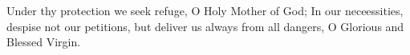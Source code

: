 \begin{otherlanguage}{english}Under thy protection we seek refuge, O Holy Mother of God;
In our neceessities, despise not our petitions,
but deliver us always from all dangers,
O Glorious and Blessed Virgin.
\end{otherlanguage}